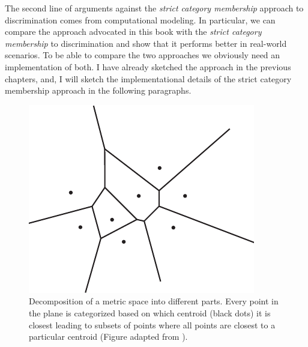 The second line of arguments against the \emph{strict category membership} 
approach to discrimination comes from computational modeling. In particular, we
can compare the approach advocated in this book with the \emph{strict category membership} 
to discrimination and show that it performs better
in real-world scenarios. To be able to compare the two approaches
we obviously need an implementation of both. I have already sketched
the approach in the previous chapters, and, I will sketch the implementational
details of the strict category membership approach in the following paragraphs.

\begin{figure}
\begin{center}
\includegraphics[width=0.3\columnwidth]{figs/voronoi}
\end{center}
\caption[Voronoi tesselation]{Decomposition of a metric space into different parts.
Every point in the plane is categorized based on which
centroid (black dots) it is closest leading to subsets of
points where all points are closest to a particular centroid (Figure adapted from 
\citealp{aurenhammer1991voronoi}).}
\label{f:voronoi}
\end{figure}


